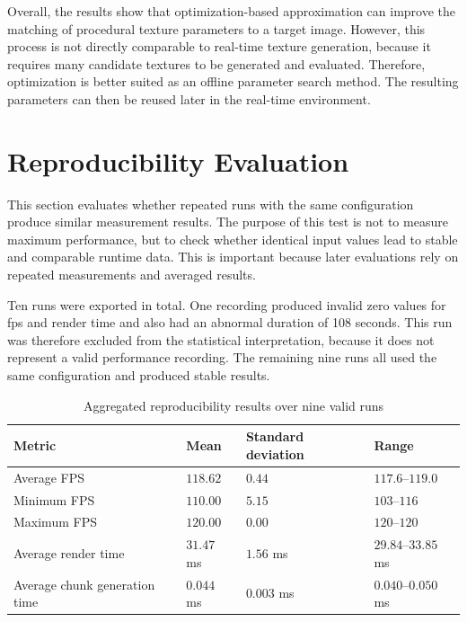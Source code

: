 Overall, the results show that optimization-based approximation can improve the matching of procedural texture parameters to a target image. However, this process is not directly comparable to real-time texture generation, because it requires many candidate textures to be generated and evaluated. Therefore, optimization is better suited as an offline parameter search method. The resulting parameters can then be reused later in the real-time environment.

\section{Reproducibility Evaluation}
\label{sec:reproducibility_evaluation}

This section evaluates whether repeated runs with the same configuration produce similar measurement results. The purpose of this test is not to measure maximum performance, but to check whether identical input values lead to stable and comparable runtime data. This is important because later evaluations rely on repeated measurements and averaged results.

Ten runs were exported in total. One recording produced invalid zero values for \gls{fps} and render time and also had an abnormal duration of 108 seconds. This run was therefore excluded from the statistical interpretation, because it does not represent a valid performance recording. The remaining nine runs all used the same configuration and produced stable results.

\begin{table}[H]
\centering
\caption{Aggregated reproducibility results over nine valid runs}
\label{tab:reproducibility_results}
\begin{tabularx}{\textwidth}{|X|X|X|X|}
\hline
\textbf{Metric} & \textbf{Mean} & \textbf{Standard deviation} & \textbf{Range} \\
\hline
\hline
Average FPS & $118.62$ & $0.44$ & $117.6$--$119.0$ \\
\hline
Minimum FPS & $110.00$ & $5.15$ & $103$--$116$ \\
\hline
Maximum FPS & $120.00$ & $0.00$ & $120$--$120$ \\
\hline
Average render time & $31.47$ ms & $1.56$ ms & $29.84$--$33.85$ ms \\
\hline
Average chunk generation time & $0.044$ ms & $0.003$ ms & $0.040$--$0.050$ ms \\
\hline
\end{tabularx}
\end{table}


